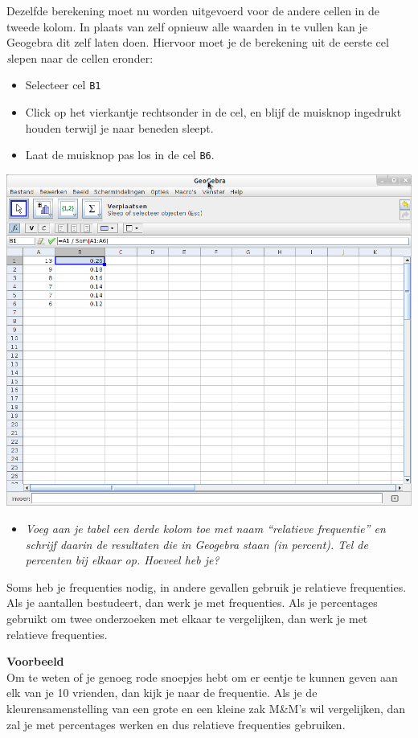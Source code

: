 \documentclass[11pt]{article}
\newcommand{\vraag}[2]{\begin{itemize}\item {\it #1} \vspace*{#2}\end{itemize}}
\begin{document}
Dezelfde berekening moet nu worden uitgevoerd voor de andere cellen in de tweede kolom. In plaats van zelf opnieuw alle waarden in te vullen kan je Geogebra dit zelf laten doen. Hiervoor moet je de berekening uit de eerste cel {\emph slepen} naar de cellen eronder:
\begin{itemize}
  \item Selecteer cel \verb#B1#
  \item Click op het vierkantje rechtsonder in de cel, en blijf de muisknop ingedrukt houden terwijl je naar beneden sleept.
  \item Laat de muisknop pas los in de cel \verb#B6#.
\end{itemize}

\begin{center}
  \includegraphics[width=14cm]{gg-relatieve_frequentie.png}
\end{center}

\vraag{Voeg aan je tabel een derde kolom toe met naam “relatieve frequentie” en schrijf daarin de
resultaten die in Geogebra staan (in percent). Tel de percenten bij elkaar op. Hoeveel heb je?
}{3cm}

Soms heb je frequenties nodig, in andere gevallen gebruik je relatieve frequenties. Als je aantallen
bestudeert, dan werk je met frequenties. Als je percentages gebruikt om twee onderzoeken met
elkaar te vergelijken, dan werk je met relatieve frequenties.

{\bf Voorbeeld}\\
Om te weten of je genoeg rode snoepjes hebt om er eentje te kunnen geven aan elk van je 10
vrienden, dan kijk je naar de frequentie.
Als je de kleurensamenstelling van een grote en een kleine zak M\&M’s wil vergelijken, dan zal je
met percentages werken en dus relatieve frequenties gebruiken.
\end{document}
